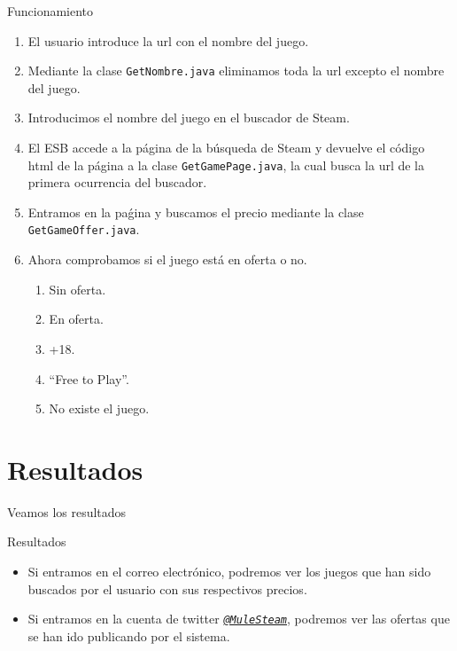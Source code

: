 \documentclass{beamer}
\begin{document}
\begin{frame}{Funcionamiento}
	\begin{enumerate}
		\item El usuario introduce la url con el nombre del juego.
		\item Mediante la clase \texttt{GetNombre.java} eliminamos toda la url excepto el nombre del juego.
		\item Introducimos el nombre del juego en el buscador de Steam.
		\item El ESB accede a la página de la búsqueda de Steam y devuelve el código html de la página a la clase \texttt{GetGamePage.java}, la cual busca la url de la primera ocurrencia del buscador.
		\item Entramos en la paǵina y buscamos el precio mediante la clase \texttt{GetGameOffer.java}.
		\item Ahora comprobamos si el juego está en oferta o no.
		\begin{enumerate}
			\item Sin oferta.
			\item En oferta.
			\item +18.
			\item ``Free to Play''.
			\item No existe el juego.
		\end{enumerate}
	\end{enumerate}
\end{frame}

\section{Resultados}
\begin{frame}{Veamos los resultados}
	\begin{block}{Resultados}
		\begin{itemize}
			\item Si entramos en el correo electrónico, podremos ver los juegos que han sido buscados por el usuario con sus respectivos precios.
			\item Si entramos en la cuenta de twitter \href{https://twitter.com/MuleSteam}{\texttt{\textit{@MuleSteam}}}, podremos ver las ofertas que se han ido publicando por el sistema.
		\end{itemize}
	\end{block}
\end{frame}
\end{document}
